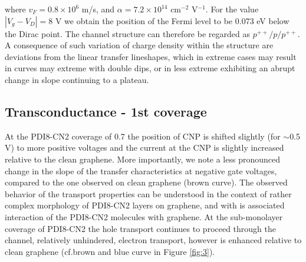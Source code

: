 \documentclass[preprint,aip,jap]{revtex4-2}
\begin{document}
where $v_F=0.
8\times10^6$ m/s, and $\alpha=7.
2\times10^{14}$ cm$^{-2}$ V$^{-1}$.
 For the value $|V_g-V_D |=8$ V we obtain the position of the Fermi level to be 0.073 eV below the Dirac point.
 The channel structure can therefore be regarded as $p^{++}/p/p^{++}$.
 A consequence of such variation of charge density within the structure are deviations from the linear transfer lineshapes, which in extreme cases may result in curves may extreme with double dips\cite{nouchi-2014,nam-2012}, or in less extreme exhibiting an abrupt change in slope continuing to a plateau.
 

\subsection{Transconductance - 1st coverage}
\label{sec:first}

At the PDI8-CN2 coverage of 0.7 the position of CNP is shifted slightly (for $\sim$0.5 V)  to more positive voltages and the current at the CNP is slightly increased relative to the clean graphene.
  More importantly, we note a less pronounced change in the slope of the transfer characteristics at negative gate voltages, compared to the one observed on clean graphene (brown curve).
 The observed behavior of the transport properties can be understood in the context of rather complex morphology of PDI8-CN2 layers on graphene, and with is associated interaction of the PDI8-CN2 molecules with graphene.
 At the sub-monolayer coverage of PDI8-CN2 the hole transport continues to proceed through the channel, relatively unhindered, electron transport, however is enhanced relative to clean graphene (cf.brown and blue curve in Figure \ref{fig:3}).
\end{document}
